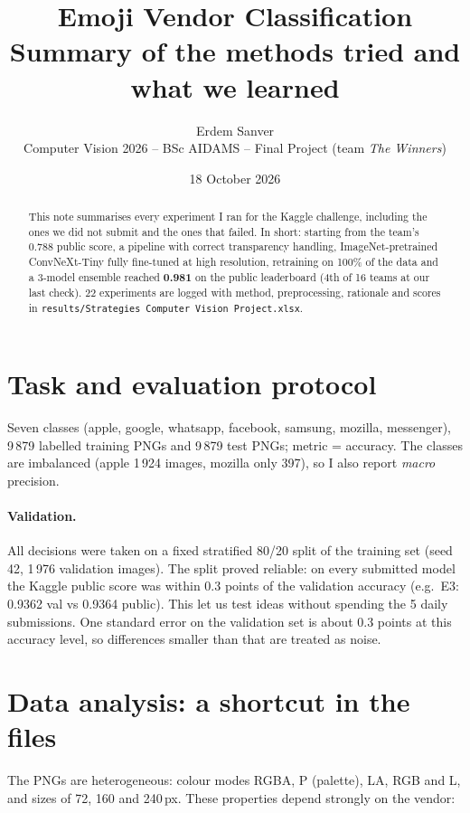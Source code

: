 \documentclass[11pt,a4paper]{article}
\title{\textbf{Emoji Vendor Classification}\\[2pt]
\large Summary of the methods tried and what we learned}
\author{Erdem Sanver\\\small Computer Vision 2026 -- BSc AIDAMS -- Final Project (team \emph{The Winners})}
\date{18 October 2026}
\newcommand{\code}[1]{\texttt{#1}}
\begin{document}
\maketitle

\begin{abstract}
\noindent This note summarises every experiment I ran for the Kaggle challenge, including the ones we
did not submit and the ones that failed. In short: starting from the team's 0.788 public score, a
pipeline with correct transparency handling, ImageNet-pretrained ConvNeXt-Tiny fully fine-tuned at
high resolution, retraining on 100\% of the data and a 3-model ensemble reached \textbf{0.981} on
the public leaderboard (4th of 16 teams at our last check). 22 experiments are logged with method,
preprocessing, rationale and scores in \code{results/Strategies Computer Vision Project.xlsx}.
\end{abstract}

\section{Task and evaluation protocol}
Seven classes (apple, google, whatsapp, facebook, samsung, mozilla, messenger), 9\,879 labelled
training PNGs and 9\,879 test PNGs; metric = accuracy. The classes are imbalanced (apple 1\,924 images,
mozilla only 397), so I also report \emph{macro} precision.

\paragraph{Validation.} All decisions were taken on a fixed stratified 80/20 split of the training
set (seed 42, 1\,976 validation images). The split proved reliable: on every submitted model the
Kaggle public score was within 0.3 points of the validation accuracy (e.g.\ E3: 0.9362 val vs
0.9364 public). This let us test ideas without spending the 5 daily submissions.
One standard error on the validation set is about 0.3 points at this accuracy level, so differences
smaller than that are treated as noise.

\section{Data analysis: a shortcut in the files}
The PNGs are heterogeneous: colour modes RGBA, P (palette), LA, RGB and L, and sizes of 72, 160 and
240\,px. These properties depend strongly on the vendor:
\end{document}
